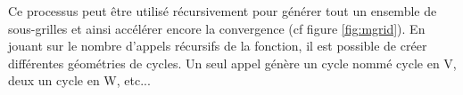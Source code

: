 Ce processus peut être utilisé récursivement pour générer tout un ensemble de sous-grilles et ainsi accélérer encore la convergence (cf figure \ref{fig:mgrid}).
En jouant sur le nombre d'appels récursifs de la fonction, il est possible de créer différentes géométries de cycles. 
Un seul appel génère un cycle nommé cycle en V, deux un cycle en W, etc... 


%



%
%


